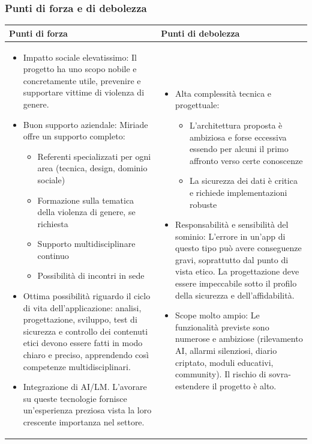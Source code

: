 \documentclass[a4paper,11pt]{article}
\begin{document}
\subsubsection{Punti di forza e di debolezza}
{\footnotesize
\begin{tabularx}{\textwidth}{|X|X|}
\hline
\rowcolor{lightgray!40} %
\textbf{Punti di forza} & \textbf{Punti di debolezza} \\
\hline
\begin{itemize}
\item Impatto sociale elevatissimo: Il progetto ha uno scopo nobile e concretamente utile, prevenire e supportare vittime di violenza di genere.
\item Buon supporto aziendale: Miriade offre un supporto completo:
\begin{itemize}
  \item Referenti specializzati per ogni area (tecnica, design, dominio sociale)
  \item Formazione sulla tematica della violenza di genere, se richiesta
  \item Supporto multidisciplinare continuo
  \item Possibilità di incontri in sede
\end{itemize}
\item Ottima possibilità riguardo il ciclo di vita dell’applicazione: analisi, progettazione, sviluppo, test di sicurezza e controllo dei contenuti etici devono essere fatti in modo chiaro e preciso, apprendendo così competenze multidisciplinari.
\item Integrazione di AI/LM. L'avorare su queste tecnologie fornisce un'esperienza preziosa vista la loro crescente importanza nel settore.
\end{itemize}
 & \begin{itemize}
\item Alta complessità tecnica e progettuale:
\begin{itemize}
  \item L'architettura proposta è ambiziosa e forse eccessiva essendo per alcuni il primo affronto verso certe conoscenze
  \item La sicurezza dei dati è critica e richiede implementazioni robuste
\end{itemize}
\item 	Responsabilità e sensibilità del sominio: L'errore in un'app di questo tipo può avere conseguenze gravi, soprattutto dal punto di vista etico. La progettazione deve essere impeccabile sotto il profilo della sicurezza e dell'affidabilità.
\item Scope molto ampio: Le funzionalità previste sono numerose e ambiziose (rilevamento AI, allarmi silenziosi, diario criptato, moduli educativi, community). Il rischio di sovra-estendere il progetto è alto.
\end{itemize} \\
\hline
\end{tabularx}
}
\end{document}
